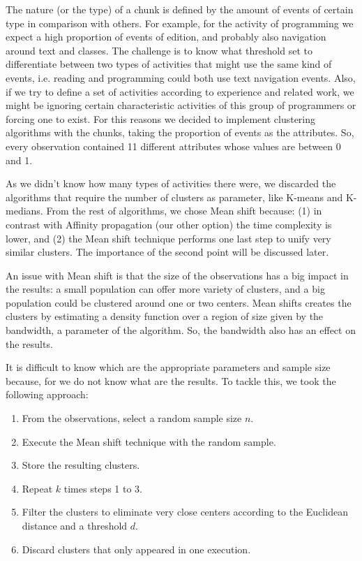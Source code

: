 The nature (or the type) of a chunk is defined by the amount of events of certain type in comparison with others. For example, for the activity of programming we expect a high proportion of events of edition, and probably also navigation around text and classes. The challenge is to know what threshold set to differentiate between two types of activities that might use the same kind of events, i.e. reading and programming could both use text navigation events. Also, if we try to define a set of activities according to experience and related work, we might be ignoring certain characteristic activities of this group of programmers or forcing one to exist. For this reasons we decided to implement clustering algorithms with the chunks, taking the proportion of events as the attributes. So, every observation contained 11 different attributes whose values are between 0 and 1.

As we didn't know how many types of activities there were, we discarded the algorithms that require the number of clusters as parameter, like K-means and K-medians. From the rest of algorithms, we chose Mean shift because: (1) in contrast with Affinity propagation (our other option) the time complexity is lower, and (2) the Mean shift technique performs one last step to unify very similar clusters. The importance of the second point will be discussed later.

An issue with Mean shift is that the size of the observations has a big impact in the results: a small population can offer more variety of clusters, and a big population could be clustered around one or two centers. Mean shifts creates the clusters by estimating a density function over a region of size given by the bandwidth, a parameter of the algorithm. So, the bandwidth also has an effect on the results.

It is difficult to know which are the appropriate parameters and sample size because, for we do not know what are the results. To tackle this, we took the following approach:
\begin{enumerate}
	\item From the observations, select a random sample size $n$.
	\item Execute the Mean shift technique with the random sample.
	\item Store the resulting clusters.
	\item Repeat $k$ times steps 1 to 3.
	\item Filter the clusters to eliminate very close centers according to the Euclidean distance and a threshold $d$. 
	\item Discard clusters that only appeared in one execution.
\end{enumerate}

